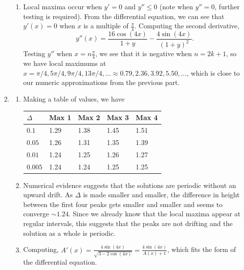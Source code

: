 \begin{enumerate}
\begin{enumerate}
					\item Local maxima occur when $y'=0$ and $y''\leq 0$ (note when $y''=0$, further testing is required).
					From the differential equation, we can see that $y'(x)=0$ when $x$ is a multiple of $\frac{\pi}{4}$.
					Computing the second derivative,
					\[
						y''(x) = \frac{16\cos(4x)}{1+y} - \frac{4\sin(4x)}{(1+y)^2}.
					\]
					Testing $y''$ when $x=n\frac{\pi}{4}$, we see that it is negative when $n=2k+1$, so we have local maximums at
					$x=\pi/4, 5\pi/4, 9\pi/4, 13\pi/4,\ldots\approx0.79,2.36,3.92,5.50,\ldots$, which is close to our numeric approximations
					from the previous part.

			\end{enumerate}
			\item \begin{enumerate}
					\item Making a table of values, we have

					\begin{tabular}{l|l|l|l|l}
						$\Delta$&Max 1&Max 2&Max 3 &Max 4\\
						\hline
						$0.1$    & 1.29 & 1.38 & 1.45 & 1.51 \\
						$0.05$   & 1.26 & 1.31 & 1.35 & 1.39 \\
						$0.01$   & 1.24 & 1.25 & 1.26 & 1.27 \\
						$0.005$  & 1.24 & 1.24 & 1.25 & 1.25
					\end{tabular}

					\item Numerical evidence suggests that the solutions are periodic without an upward drift. As $\Delta$ is
					made smaller and smaller, the difference in height between the first four peaks gets smaller and smaller and
					seems to converge $\sim 1.24$. Since we already know that the local maxima appear at regular intervals, this suggests
					that the peaks are not drifting and the solution as a whole is periodic.

					\item Computing, $\displaystyle A'(x) = \frac{4\sin(4x)}{\sqrt{3-2\cos(4x)}} = \frac{4\sin(4x)}{A(x)+1}$, which fits the form
					of the differential equation.


\end{enumerate}
\end{enumerate}
